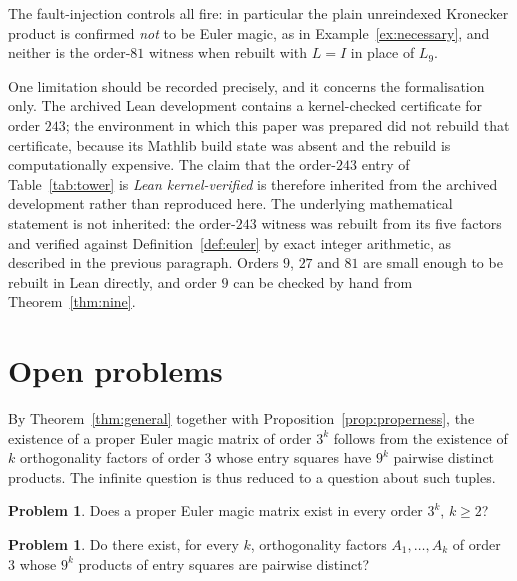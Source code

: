 \documentclass[11pt,a4paper]{amsart}
\theoremstyle{plain}
\theoremstyle{definition}
\newtheorem{problem}[theorem]{Problem}
\theoremstyle{remark}
\begin{document}
The fault-injection controls all fire: in particular the plain unreindexed
Kronecker product is confirmed \emph{not} to be Euler magic, as in
Example~\ref{ex:necessary}, and neither is the order-$81$ witness when rebuilt
with $L=I$ in place of $L_9$.

One limitation should be recorded precisely, and it concerns the formalisation
only. The archived Lean development contains a kernel-checked certificate for
order $243$; the environment in which this paper was prepared did not rebuild
that certificate, because its Mathlib build state was absent and the rebuild is
computationally expensive. The claim that the order-$243$ entry of
Table~\ref{tab:tower} is \emph{Lean kernel-verified} is therefore inherited from
the archived development rather than reproduced here. The underlying
mathematical statement is not inherited: the order-$243$ witness was rebuilt
from its five factors and verified against Definition~\ref{def:euler} by exact
integer arithmetic, as described in the previous paragraph. Orders $9$, $27$ and
$81$ are small enough to be rebuilt in Lean directly, and order $9$ can be
checked by hand from Theorem~\ref{thm:nine}.

\section{Open problems}\label{sec:open}

By Theorem~\ref{thm:general} together with
Proposition~\ref{prop:properness}, the existence of a proper Euler magic matrix
of order $3^k$ follows from the existence of $k$ orthogonality factors of order
$3$ whose entry squares have $9^k$ pairwise distinct products. The infinite
question is thus reduced to a question about such tuples.

\begin{problem}\label{prob:main}
Does a proper Euler magic matrix exist in every order $3^k$, $k\ge2$?
\end{problem}

\begin{problem}\label{prob:tuples}
Do there exist, for every $k$, orthogonality factors $A_1,\dots,A_k$ of order
$3$ whose $9^k$ products of entry squares are pairwise distinct?
\end{problem}
\end{document}

